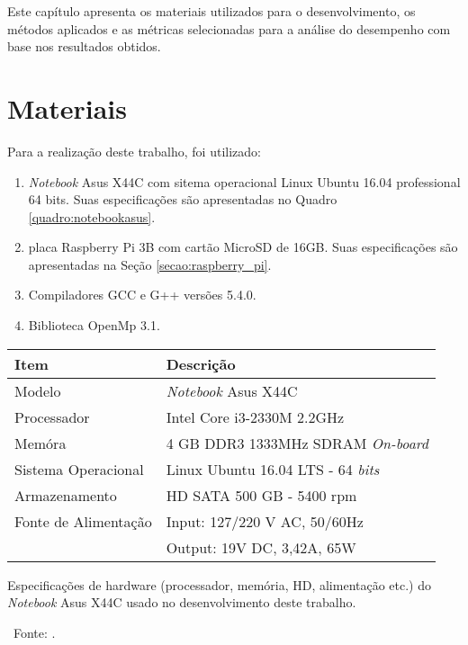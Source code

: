 Este capítulo apresenta os materiais utilizados para o desenvolvimento, os métodos aplicados e as métricas selecionadas para a análise do desempenho com base nos resultados obtidos.

\section{Materiais}
\label{secao:materiais}

Para a realização deste trabalho, foi utilizado: 
\begin{enumerate}
	\item \textit{Notebook} Asus X44C com sitema operacional Linux Ubuntu 16.04 professional 64 bits. Suas especificações são apresentadas no Quadro \ref{quadro:notebookasus}.
	
	\item placa Raspberry Pi 3B com cartão MicroSD de 16GB. Suas especificações são apresentadas na Seção \ref{secao:raspberry_pi}.
	
	\item Compiladores GCC e G++ versões 5.4.0.
	
	\item Biblioteca OpenMp 3.1.	
\end{enumerate}

\begin{quadro}[htb] \centering
	\begin{tabular}{ll}        \hline
		\textbf{Item}		 & \textbf{Descrição}						  \\ \hline \hline
		Modelo               & \textit{Notebook} Asus X44C                \\ 
		Processador          & Intel Core i3-2330M 2.2GHz                 \\ 
		Memóra               & 4 GB DDR3 1333MHz SDRAM \textit{On-board}  \\ 
		Sistema Operacional  & Linux Ubuntu 16.04 LTS - 64 \textit{bits}  \\ 
		Armazenamento        & HD SATA 500 GB - 5400 rpm                  \\ 
		Fonte de Alimentação & Input: 127/220 V AC, 50/60Hz               \\
		& Output: 19V DC, 3,42A, 65W                 \\ \hline
	\end{tabular}
	\caption{Especificações de hardware (processador, memória, HD, alimentação etc.) do \textit{Notebook} Asus X44C usado no desenvolvimento deste trabalho.}
	\ Fonte: \cite{asus:2017:x44c}.
	\label{quadro:notebookasus}
\end{quadro}


